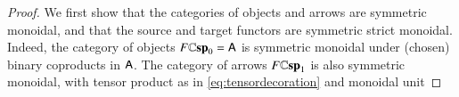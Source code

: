 \documentclass[reqno]{amsart}
\begin{document}
\begin{proof}
We first show that the categories of objects and arrows are symmetric monoidal, and that the source and target functors are symmetric strict monoidal.
Indeed, the category of objects $F\mathbf{\mathbb Csp}_0=\mathsf{A}$ is symmetric monoidal under (chosen) binary coproducts in $\mathsf{A}$. The category of arrows
$F\mathbf{\mathbb Csp}_1$ is also symmetric monoidal, with tensor product as in \cref{eq:tensordecoration} and monoidal unit
\begin{comment}
The category of arrows $F\lCsp_1$ has:
\begin{enumerate}
\item{objects as $F$-decorated cospans, which are pairs:
\[
\begin{tikzpicture}[scale=1.5]
\node (A) at (0,0) {$(a$};
\node (B) at (1,0) {$m$};
\node (C) at (2,0) {$b,$};
\node (D) at (2.6,0) {$x \in F(m))$};
\path[->,font=\scriptsize,>=angle 90]
(A) edge node[above]{$i$} (B)
(C) edge node[above]{$o$} (B);
\end{tikzpicture}
\]
and}
\item{morphisms as maps of $F$-decorated cospans, which are cospans in $\A$
\[
\begin{tikzpicture}[scale=1.5]
\node (A) at (0,0.5) {$a$};
\node (A') at (0,-0.5) {$a'$};
\node (B) at (1,0.5) {$m$};
\node (C) at (2,0.5) {$b$};
\node (C') at (2,-0.5) {$b'$};
\node (D) at (1,-0.5) {$m'$};
\node (E) at (3,0.5) {$x \in F(m)$};
\node (F) at (3,-0.5) {$x' \in F(m')$};
\path[->,font=\scriptsize,>=angle 90]
(A) edge node[above]{$i$} (B)
(C) edge node[above]{$o$} (B)
(A) edge node[left]{$f$} (A')
(C) edge node[right]{$g$} (C')
(A') edge node [above]{$i'$} (D)
(C') edge node [above]{$o'$} (D)
(B) edge node [left] {$h$} (D);
\end{tikzpicture}
\]
together with a decoration morphism $\tau \maps F(h)(x) \to x'$.
}
\end{enumerate}
First we define the tensor product and monoidal unit of $F\lCsp_1$. Given two objects $M_1$ and $M_2$ of $F\lCsp_1$:

\end{comment}
\end{proof}
\end{document}
